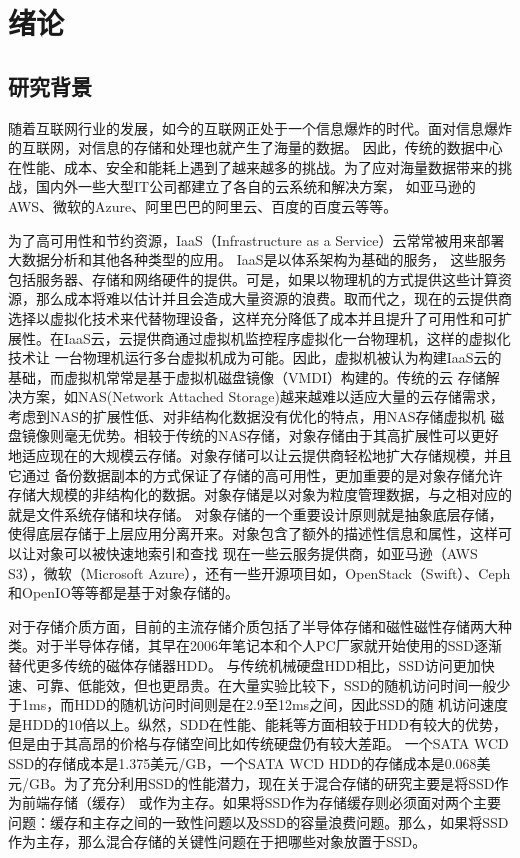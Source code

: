 
\chapter{绪论}
\label{chap:intro}

\section{研究背景}
随着互联网行业的发展，如今的互联网正处于一个信息爆炸的时代。面对信息爆炸的互联网，对信息的存储和处理也就产生了海量的数据。
因此，传统的数据中心在性能、成本、安全和能耗上遇到了越来越多的挑战。为了应对海量数据带来的挑战，国内外一些大型IT公司都建立了各自的云系统和解决方案，
如亚马逊的AWS、微软的Azure、阿里巴巴的阿里云、百度的百度云等等。

为了高可用性和节约资源，IaaS（Infrastructure as a Service）云常常被用来部署大数据分析和其他各种类型的应用。 IaaS是以体系架构为基础的服务，
这些服务包括服务器、存储和网络硬件的提供\cite{bhardwaj2010cloud}。可是，如果以物理机的方式提供这些计算资源，那么成本将难以估计并且会造成大量资源的浪费。取而代之，现在的云提供商
选择以虚拟化技术来代替物理设备，这样充分降低了成本并且提升了可用性和可扩展性。在IaaS云，云提供商通过虚拟机监控程序虚拟化一台物理机，这样的虚拟化技术让
一台物理机运行多台虚拟机成为可能\cite{feng2014price}。因此，虚拟机被认为构建IaaS云的基础，而虚拟机常常是基于虚拟机磁盘镜像（VMDI）构建的。传统的云
存储解决方案，如NAS(Network Attached Storage)越来越难以适应大量的云存储需求，考虑到NAS的扩展性低、对非结构化数据没有优化的特点，用NAS存储虚拟机
磁盘镜像则毫无优势。相较于传统的NAS存储，对象存储由于其高扩展性可以更好地适应现在的大规模云存储。对象存储可以让云提供商轻松地扩大存储规模，并且它通过
备份数据副本的方式保证了存储的高可用性，更加重要的是对象存储允许存储大规模的非结构化的数据。对象存储是以对象为粒度管理数据，与之相对应的就是文件系统存储和块存储。
对象存储的一个重要设计原则就是抽象底层存储，使得底层存储于上层应用分离开来。对象包含了额外的描述性信息和属性，这样可以让对象可以被快速地索引和查找
现在一些云服务提供商，如亚马逊（AWS S3），微软（Microsoft Azure），还有一些开源项目如，OpenStack（Swift）、Ceph和OpenIO等等都是基于对象存储的。

对于存储介质方面，目前的主流存储介质包括了半导体存储和磁性磁性存储两大种类。对于半导体存储，其早在2006年笔记本和个人PC厂家就开始使用的SSD逐渐替代更多传统的磁体存储器HDD。
与传统机械硬盘HDD相比，SSD访问更加快速、可靠、低能效，但也更昂贵。在大量实验比较下，SSD的随机访问时间一般少于1ms，而HDD的随机访问时间则是在2.9至12ms之间，因此SSD的随
机访问速度是HDD的10倍以上\cite{kasavajhala2011solid}。纵然，SDD在性能、能耗等方面相较于HDD有较大的优势，但是由于其高昂的价格与存储空间比如传统硬盘仍有较大差距。
一个SATA WCD SSD的存储成本是1.375美元/GB，一个SATA WCD HDD的存储成本是0.068美元/GB。为了充分利用SSD的性能潜力，现在关于混合存储的研究主要是将SSD作为前端存储（缓存）
或作为主存。如果将SSD作为存储缓存则必须面对两个主要问题：缓存和主存之间的一致性问题以及SSD的容量浪费问题。那么，如果将SSD作为主存，那么混合存储的关键性问题在于把哪些对象放置于SSD。


